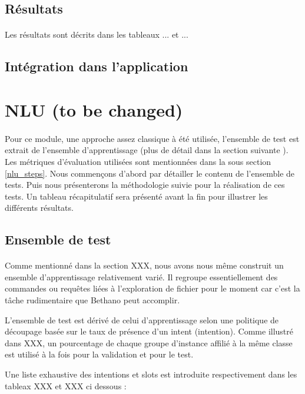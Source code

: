 	\subsection{Résultats}
	\paragraph{}
	Les résultats sont décrits dans les tableaux ... et ...
	\subsection{Intégration dans l'application}

\section{NLU (to be changed)}
\paragraph{}
Pour ce module, une approche assez classique à été utilisée, l'ensemble de test est extrait de l'ensemble d'apprentissage (plus de détail dans la section suivante ). Les métriques d'évaluation utilisées sont mentionnées dans la sous section \ref{nlu_steps}. Nous commençons d'abord par détailler le contenu de l'ensemble de tests. Puis nous présenterons la méthodologie suivie pour la réalisation de ces tests. Un tableau récapitulatif sera présenté avant la fin pour illustrer les différents résultats.
	\subsection{Ensemble de test}
	\paragraph{}
	Comme mentionné dans la section XXX, nous avons nous même construit un ensemble d'apprentissage relativement varié. Il regroupe essentiellement des commandes ou requêtes liées à l'exploration de fichier pour le moment car c'est la tâche rudimentaire que Bethano peut accomplir.
	\par
	L'ensemble de test est dérivé de celui d'apprentissage selon une politique de découpage basée sur le taux de présence d'un intent (intention). Comme illustré dans XXX, un pourcentage de chaque groupe d'instance affilié à la même classe est utilisé à la fois pour la validation et pour le test.
	
	Une liste exhaustive des intentions et slots est introduite respectivement dans les tableax XXX et XXX ci dessous :
